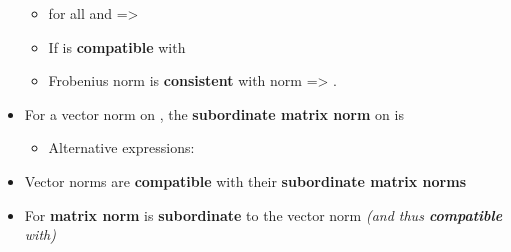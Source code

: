 \begin{itemize}
        \begin{itemize}

          \item
                for all  and
                 =\textgreater{}
          \item
                If  is \textbf{compatible} with
          \item
                Frobenius norm is \textbf{consistent} with  norm
                =\textgreater{} .
        \end{itemize}
  \item
        For a vector norm \iMbox{\|\cdot\|} on , the
        \textbf{subordinate matrix norm} \iMbox{\|\cdot\|} on
         is

        \begin{itemize}

          \item
                Alternative expressions:
        \end{itemize}
  \item
        Vector norms are \textbf{compatible} with their \textbf{subordinate
          matrix norms}
  \item
        For  \textbf{matrix norm}  is
        \textbf{subordinate} to the vector norm  \emph{(and
          thus \textbf{compatible} with)}
\end{itemize}

